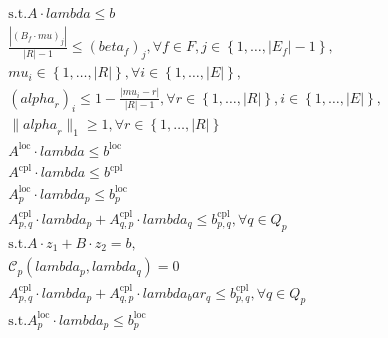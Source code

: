 \begin{align}
  & \text{s}.\text{t}. A \cdot \mathit{lambda} \leq b \tag{eq\_0002} \\
  & \frac{\left|\left(B_{f} \cdot \mathit{mu}\right)_{j}\right|}{\left|R\right| - 1} \leq \left(\mathit{beta}_{f}\right)_{j} , \forall f \in F , j \in \left\{1 , \ldots , \left|\right. E_{f} \left|\right. - 1\right\} , \tag{eq\_0004} \\
  & \mathit{mu}_{i} \in \left\{1 , \ldots , \left|R\right|\right\} , \forall i \in \left\{1 , \ldots , \left|E\right|\right\} , \tag{eq\_0005} \\
  & \left(\mathit{alpha}_{r}\right)_{i} \leq 1 - \frac{\left|\mathit{mu}_{i} - r\right|}{\left|R\right| - 1} , \forall r \in \left\{1 , \ldots , \left|R\right|\right\} , i \in \left\{1 , \ldots , \left|E\right|\right\} , \tag{eq\_0006} \\
  & \parallel \mathit{alpha}_{r} \parallel_{1} \geq 1 , \forall r \in \left\{1 , \ldots , \left|R\right|\right\} \tag{eq\_0007} \\
  & A^{\text{loc}} \cdot \mathit{lambda} \leq b^{\text{loc}} \tag{eq\_0008} \\
  & A^{\text{cpl}} \cdot \mathit{lambda} \leq b^{\text{cpl}} \tag{eq\_0009} \\
  & A_{p}^{\text{loc}} \cdot \mathit{lambda}_{p} \leq b_{p}^{\text{loc}} \tag{eq\_0011} \\
  & A_{p , q}^{\text{cpl}} \cdot \mathit{lambda}_{p} + A_{q , p}^{\text{cpl}} \cdot \mathit{lambda}_{q} \leq b_{p , q}^{\text{cpl}} , \forall q \in Q_{p} \tag{eq\_0012} \\
  & \text{s}.\text{t}. A \cdot z_{1} + B \cdot z_{2} = b , \tag{eq\_0014} \\
  & \mathbf{\mathcal{C}}_{p} \left(\mathit{lambda}_{p} , \mathit{lambda}_{q}\right) = 0 \tag{eq\_0019} \\
  & A_{p , q}^{\text{cpl}} \cdot \mathit{lambda}_{p} + A_{q , p}^{\text{cpl}} \cdot lambda_bar_{q} \leq b_{p , q}^{\text{cpl}} , \forall q \in Q_{p} \tag{eq\_0024} \\
  & \text{s}.\text{t}. A_{p}^{\text{loc}} \cdot \mathit{lambda}_{p} \leq b_{p}^{\text{loc}} \tag{eq\_0026} \\

\end{align}
